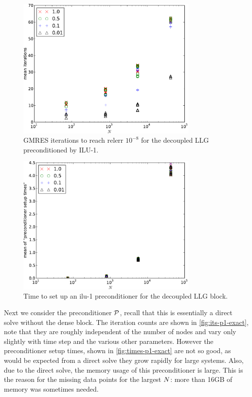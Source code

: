 \begin{figure}
  \centering
  \includegraphics[width=0.8\textwidth]{plots/linear_solvers/ilu-1decoupleddummy-meanofnsolveritersvsinitialnnode.pdf}
  \caption{GMRES iterations to reach relerr $10^{-8}$ for the decoupled LLG preconditioned by ILU-1.}
  \label{fig:its-ilu-decoupled}
\end{figure}

\begin{figure}
  \centering
  \includegraphics[width=0.8\textwidth]{plots/linear_solvers/ilu-1decoupleddummy-meanofpreconditionersetuptimesvsinitialnnode.pdf}
  \caption{Time to set up an ilu-1 preconditioner for the decoupled LLG block.}
  \label{fig:times-ilu-decoupled}
\end{figure}


Next we consider the preconditioner $\mathcal{P}$, recall that this is essentially a direct solve without the dense block.
The iteration counts are shown in \cref{fig:its-p1-exact}, note that they are roughly independent of the number of nodes and vary only slightly with time step and the various other parameters.
However the preconditioner setup times, shown in \cref{fig:times-p1-exact} are not so good, as would be expected from a direct solve they grow rapidly for large systems.
Also, due to the direct solve, the memory usage of this preconditioner is large.
This is the reason for the missing data points for the largest $N$: more than 16GB of memory was sometimes needed.

